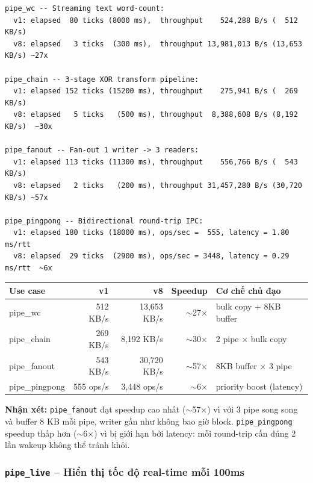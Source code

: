 \documentclass[11pt,a4paper]{article}
\begin{document}
\begin{lstlisting}[style=plain]
pipe_wc -- Streaming text word-count:
  v1: elapsed  80 ticks (8000 ms),  throughput    524,288 B/s (  512 KB/s)
  v8: elapsed   3 ticks  (300 ms),  throughput 13,981,013 B/s (13,653 KB/s) ~27x

pipe_chain -- 3-stage XOR transform pipeline:
  v1: elapsed 152 ticks (15200 ms), throughput    275,941 B/s (  269 KB/s)
  v8: elapsed   5 ticks   (500 ms), throughput  8,388,608 B/s (8,192 KB/s)  ~30x

pipe_fanout -- Fan-out 1 writer -> 3 readers:
  v1: elapsed 113 ticks (11300 ms), throughput    556,766 B/s (  543 KB/s)
  v8: elapsed   2 ticks   (200 ms), throughput 31,457,280 B/s (30,720 KB/s) ~57x

pipe_pingpong -- Bidirectional round-trip IPC:
  v1: elapsed 180 ticks (18000 ms), ops/sec =  555, latency = 1.80 ms/rtt
  v8: elapsed  29 ticks  (2900 ms), ops/sec = 3448, latency = 0.29 ms/rtt  ~6x
\end{lstlisting}

\begin{center}
\begin{tabular}{lrrrl}
\toprule
\textbf{Use case} & \textbf{v1} & \textbf{v8} & \textbf{Speedup} & \textbf{Cơ chế chủ đạo} \\
\midrule
pipe\_wc      & 512 KB/s    & 13{,}653 KB/s  & $\sim$27$\times$  & bulk copy + 8KB buffer \\
pipe\_chain   & 269 KB/s    &  8{,}192 KB/s  & $\sim$30$\times$  & 2 pipe $\times$ bulk copy \\
pipe\_fanout  & 543 KB/s    & 30{,}720 KB/s  & $\sim$57$\times$  & 8KB buffer $\times$ 3 pipe \\
pipe\_pingpong & 555 ops/s  &  3{,}448 ops/s & $\sim$6$\times$   & priority boost (latency) \\
\bottomrule
\end{tabular}
\end{center}

\textbf{Nhận xét:} \texttt{pipe\_fanout} đạt speedup cao nhất ($\sim$57$\times$) vì với 3 pipe song song và buffer 8 KB mỗi pipe, writer gần như không bao giờ block. \texttt{pipe\_pingpong} speedup thấp hơn ($\sim$6$\times$) vì bị giới hạn bởi latency: mỗi round-trip cần đúng 2 lần wakeup không thể tránh khỏi.

\subsubsection{\texttt{pipe\_live} -- Hiển thị tốc độ real-time mỗi 100ms}
\end{document}
